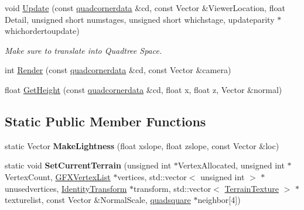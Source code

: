\begin{DoxyCompactItemize}
\item 
void \hyperlink{classquadsquare_a8621dc9333761267c05ae5ecc3eb4a05}{Update} (const \hyperlink{structquadcornerdata}{quadcornerdata} \&cd, const Vector \&Viewer\+Location, float Detail, unsigned short numstages, unsigned short whichstage, updateparity $\ast$whichordertoupdate)
\begin{DoxyCompactList}\small\item\em Make sure to translate into Quadtree Space. \end{DoxyCompactList}\item 
int \hyperlink{classquadsquare_aac424c2948d0ce3a53f0927bcba3b644}{Render} (const \hyperlink{structquadcornerdata}{quadcornerdata} \&cd, const Vector \&camera)
\item 
float \hyperlink{classquadsquare_aa466f2c5e442a3c6d61207f64684e3a7}{Get\+Height} (const \hyperlink{structquadcornerdata}{quadcornerdata} \&cd, float x, float z, Vector \&normal)
\end{DoxyCompactItemize}
\subsection*{Static Public Member Functions}
\begin{DoxyCompactItemize}
\item 
static Vector {\bfseries Make\+Lightness} (float xslope, float zslope, const Vector \&loc)\hypertarget{classquadsquare_a3be523357e5fb8029a4853b5f2fbdc64}{}\label{classquadsquare_a3be523357e5fb8029a4853b5f2fbdc64}

\item 
static void {\bfseries Set\+Current\+Terrain} (unsigned int $\ast$Vertex\+Allocated, unsigned int $\ast$Vertex\+Count, \hyperlink{classGFXVertexList}{G\+F\+X\+Vertex\+List} $\ast$vertices, std\+::vector$<$ unsigned int $>$ $\ast$unusedvertices, \hyperlink{classIdentityTransform}{Identity\+Transform} $\ast$transform, std\+::vector$<$ \hyperlink{structTerrainTexture}{Terrain\+Texture} $>$ $\ast$texturelist, const Vector \&Normal\+Scale, \hyperlink{classquadsquare}{quadsquare} $\ast$neighbor\mbox{[}4\mbox{]})\hypertarget{classquadsquare_a3ed4a46dd58d0c6af6f5e9401084b8c4}{}\label{classquadsquare_a3ed4a46dd58d0c6af6f5e9401084b8c4}

\end{DoxyCompactItemize}
